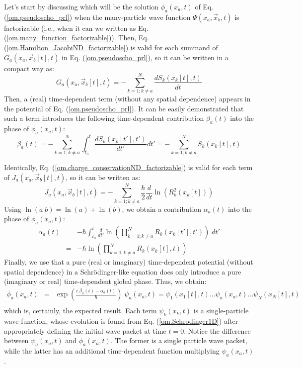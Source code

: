 \documentclass[nofootinbib, secnumarabic, amsmath, nobibnotes,10pt,aps,pra]{revtex4-1}
\newcommand{\eref}[1]{Eq. (\ref{#1})}
\begin{document}
Let's start by discussing which  will be the solution
$\phi_{a}(x_{a},t)$ of \eref{om.pseudoscho_prl} when the
many-particle wave function $\Psi(x_a,\vec x_b,t)$ is factorizable
(i.e., when it can we written as
\eref{om.many_function_factorizable}). Then,
\eref{om.Hamilton_JacobiND_factorizable} is valid for each summand
of $G_{a}(x_{a},\vec x_{b}[t],t)$ in
\eref{om.pseudoscho_prl}, so it can be written in a compact way as:
\begin{equation}
\label{om.prlpas_factorizable1}
G_{a}(x_{a},\vec x_{b}[t],t) = -\sum_{k = 1;k\neq a}^{N} \frac {d S_k(x_k[t],t)} {dt}
\end{equation}
Then, a (real) time-dependent term (without any spatial dependence)
appears in the potential of \eref{om.pseudoscho_prl}. It can be
easily demonstrated that such a term introduces the following
time-dependent contribution  \textit{$ \beta_a(t)$} into the phase of
$\phi_a(x_a,t)$:
\begin{equation}
\label{om.prlbeta}
\beta_a(t) = - \sum_{k = 1;k\neq a}^{N} \int_{t_0}^{t} \frac {d S_k(x_k[t'],t')} {dt'} dt' = -\sum_{k = 1;k\neq a}^{N} S_k(x_k[t],t)
\end{equation}

Identically, \eref{om.charge_conservationND_factorizable} is valid for each term of $J_{a}(x_{a},\vec x_{b}[t],t)$, so it can be written as:
\begin{equation}
\label{om.prlpas_factorizable2}
J_{a}(x_{a},\vec x_{b}[t],t) = -\sum_{k = 1;k\neq a}^{N} \frac {\hbar} {2} \frac {d} {dt} \ln \left( R_{k}^2(x_k[t]) \right)
\end{equation}
Using $\ln (a \; b) = \ln (a) + \ln (b)$, we obtain a contribution  $\alpha_a(t)$ into the phase of $\phi_a(x_a,t)$:
\begin{eqnarray}
\label{om.prlalpha} \alpha_a(t) &=& -\hbar \int_{t_0}^{t} \frac {d}
{dt'} \ln \left( \prod_{k = 1;k\neq a}^{N} R_k(x_k[t'],t') \right) \;
dt'\nonumber\\ &=& -\hbar \ln \left( \prod_{k = 1;k\neq a}^{N}
R_k(x_k[t],t) \right)
\end{eqnarray}
Finally, we use that a pure (real or imaginary) time-dependent
potential (without spatial dependence) in a Schr\"odinger-like
equation does only introduce a pure (imaginary or real)
time-dependent global phase. Thus, we obtain:
\begin{eqnarray}
\label{om.prlpas_factorizable3}
\phi_a(x_a,t) &=& \exp\left(\frac {i \; \beta_a(t)-\alpha_a(t)} {\hbar}\right) \;\psi_a(x_a,t)= \psi_1(x_1[t],t)\ldots\psi_a(x_a,t)\ldots\psi_N(x_N[t],t)\nonumber\\
\end{eqnarray}
which is, certainly, the expected result. Each term \textit{$\psi_k(x_k,t)$} is a single-particle wave function, whose evolution is found from \eref{om.Schrodinger1D} after appropriately defining the initial wave packet at time $t = 0$. Notice the difference between $\psi_a(x_a,t)$ and $\phi_a(x_a,t)$. The former is a single particle wave packet, while the latter has an additional time-dependent function multiplying $\psi_a(x_a,t)$.
\end{document}

